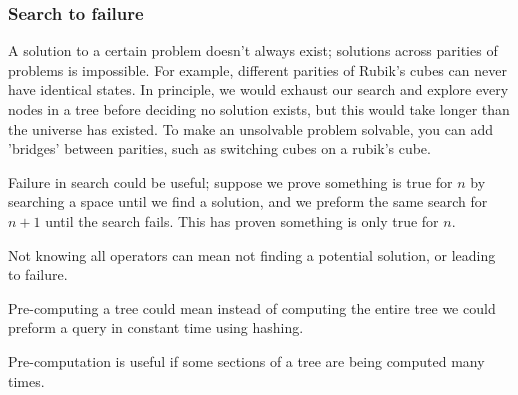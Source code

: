 \documentclass{chezarticle}
\begin{document}
\subsubsection{Search to failure}
A solution to a certain problem doesn't always exist; solutions across parities of problems is impossible. For example, different parities of Rubik's cubes can never have identical states. In principle, we would exhaust our search and explore every nodes in a tree before deciding no solution exists, but this would take longer than the universe has existed. To make an unsolvable problem solvable, you can add 'bridges' between parities, such as switching cubes on a rubik's cube. 
\begin{note}
Failure in search could be useful; suppose we prove something is true for $n$ by searching a space until we find a solution, and we preform the same search for $n+1$ until the search fails. This has proven something is only true for $n$. 
\end{note}
Not knowing all operators can mean not finding a potential solution, or leading to failure.
\begin{definition}
Pre-computing a tree could mean instead of computing the entire tree we could preform a query in constant time using hashing. 
\end{definition}
Pre-computation is useful if some sections of a tree are being computed many times.
\end{document}
